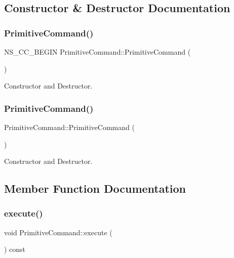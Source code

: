 \subsection{Constructor \& Destructor Documentation}
\mbox{\label{classPrimitiveCommand_a1f7d6e04c76c87b9d03833be7de76ea9}} 
\subsubsection{\texorpdfstring{Primitive\+Command()}{PrimitiveCommand()}\hspace{0.1cm}{\footnotesize\ttfamily [1/2]}}
{\footnotesize\ttfamily N\+S\+\_\+\+C\+C\+\_\+\+B\+E\+G\+IN Primitive\+Command\+::\+Primitive\+Command (\begin{DoxyParamCaption}{ }\end{DoxyParamCaption})}

Constructor and Destructor. \mbox{\label{classPrimitiveCommand_ab8f1ab4e3d899f9ee8e72c12e117b7c8}} 
\subsubsection{\texorpdfstring{Primitive\+Command()}{PrimitiveCommand()}\hspace{0.1cm}{\footnotesize\ttfamily [2/2]}}
{\footnotesize\ttfamily Primitive\+Command\+::\+Primitive\+Command (\begin{DoxyParamCaption}{ }\end{DoxyParamCaption})}

Constructor and Destructor. 

\subsection{Member Function Documentation}
\mbox{\label{classPrimitiveCommand_aeac9906f9e9ea410c5cc701c17be80fd}} 
\subsubsection{\texorpdfstring{execute()}{execute()}\hspace{0.1cm}{\footnotesize\ttfamily [1/2]}}
{\footnotesize\ttfamily void Primitive\+Command\+::execute (\begin{DoxyParamCaption}{ }\end{DoxyParamCaption}) const}

